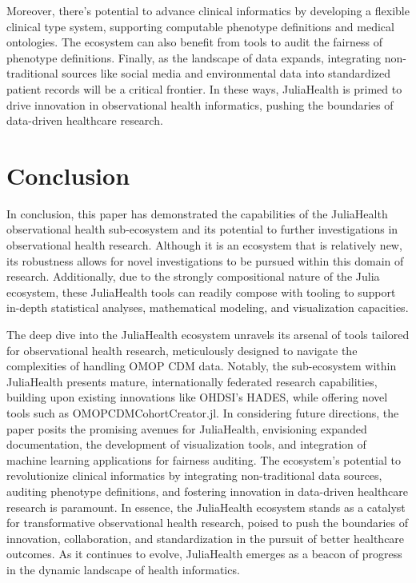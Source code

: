 \documentclass{juliacon}
\begin{document}
Moreover, there's potential to advance clinical informatics by developing a flexible clinical type system, supporting computable phenotype definitions and medical ontologies. The ecosystem can also benefit from tools to audit the fairness of phenotype definitions. Finally, as the landscape of data expands, integrating non-traditional sources like social media and environmental data into standardized patient records will be a critical frontier. In these ways, JuliaHealth is primed to drive innovation in observational health informatics, pushing the boundaries of data-driven healthcare research.

\section{Conclusion}

In conclusion, this paper has demonstrated the capabilities of the JuliaHealth observational health sub-ecosystem and its potential to further investigations in observational health research.
Although it is an ecosystem that is relatively new, its robustness allows for novel investigations to be pursued within this domain of research. 
Additionally, due to the strongly compositional nature of the Julia ecosystem, these JuliaHealth tools can readily compose with tooling to support in-depth statistical analyses, mathematical modeling, and visualization capacities.

The deep dive into the JuliaHealth ecosystem unravels its arsenal of tools tailored for observational health research, meticulously designed to navigate the complexities of handling OMOP CDM data. Notably, the sub-ecosystem within JuliaHealth presents mature, internationally federated research capabilities, building upon existing innovations like OHDSI's HADES, while offering novel tools such as OMOPCDMCohortCreator.jl.
In considering future directions, the paper posits the promising avenues for JuliaHealth, envisioning expanded documentation, the development of visualization tools, and integration of machine learning applications for fairness auditing. The ecosystem's potential to revolutionize clinical informatics by integrating non-traditional data sources, auditing phenotype definitions, and fostering innovation in data-driven healthcare research is paramount.
In essence, the JuliaHealth ecosystem stands as a catalyst for transformative observational health research, poised to push the boundaries of innovation, collaboration, and standardization in the pursuit of better healthcare outcomes. As it continues to evolve, JuliaHealth emerges as a beacon of progress in the dynamic landscape of health informatics.
\end{document}
